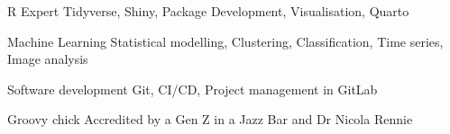 
\begin{cvskills}
  \cvskill
    {R Expert} %
    {Tidyverse, Shiny, Package Development, Visualisation, Quarto} %

  \cvskill
    {Machine Learning} %
    {Statistical modelling, Clustering, Classification, Time series, Image analysis} %

  \cvskill
    {Software development} %
    {Git, CI/CD, Project management in GitLab} %
    
  \cvskill
    {Groovy chick} %
    {Accredited by a Gen Z in a Jazz Bar and Dr Nicola Rennie} %
\end{cvskills}
